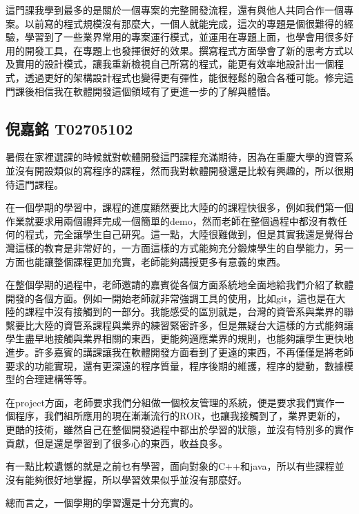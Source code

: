 這門課我學到最多的是關於一個專案的完整開發流程，還有與他人共同合作一個專案。以前寫的程式規模沒有那麼大，一個人就能完成，這次的專題是個很難得的經驗，學習到了一些業界常用的專案運行模式，並運用在專題上面，也學會用很多好用的開發工具，在專題上也發揮很好的效果。撰寫程式方面學會了新的思考方式以及實用的設計模式，讓我重新檢視自己所寫的程式，能更有效率地設計出一個程式，透過更好的架構設計程式也變得更有彈性，能很輕鬆的融合各種可能。修完這門課後相信我在軟體開發這個領域有了更進一步的了解與體悟。

\subsection*{倪嘉銘 T02705102}

暑假在家裡選課的時候就對軟體開發這門課程充滿期待，因為在重慶大學的資管系並沒有開設類似的寫程序的課程，然而我對軟體開發還是比較有興趣的，所以很期待這門課程。

在一個學期的學習中，課程的進度顯然要比大陸的的課程快很多，例如我們第一個作業就要求用兩個禮拜完成一個簡單的demo，然而老師在整個過程中都沒有教任何的程式，完全讓學生自己研究。這一點，大陸很難做到，但是其實我還是覺得台灣這樣的教育是非常好的，一方面這樣的方式能夠充分鍛煉學生的自學能力，另一方面也能讓整個課程更加充實，老師能夠講授更多有意義的東西。

在整個學期的過程中，老師邀請的嘉賓從各個方面系統地全面地給我們介紹了軟體開發的各個方面。例如一開始老師就非常強調工具的使用，比如git，這也是在大陸的課程中沒有接觸到的一部分。我能感受的區別就是，台灣的資管系與業界的聯繫要比大陸的資管系課程與業界的練習緊密許多，但是無疑台大這樣的方式能夠讓學生盡早地接觸與業界相關的東西，更能夠適應業界的規則，也能夠讓學生更快地進步。許多嘉賓的講課讓我在軟體開發方面看到了更遠的東西，不再僅僅是將老師要求的功能實現，還有更深遠的程序質量，程序後期的維護，程序的變動，數據模型的合理建構等等。

在project方面，老師要求我們分組做一個校友管理的系統，便是要求我們實作一個程序，我們組所應用的現在漸漸流行的ROR，也讓我接觸到了，業界更新的，更酷的技術，雖然自己在整個開發過程中都出於學習的狀態，並沒有特別多的實作貢獻，但是還是學習到了很多心的東西，收益良多。

有一點比較遺憾的就是之前乜有學習，面向對象的C++和java，所以有些課程並沒有能夠很好地掌握，所以學習效果似乎並沒有那麼好。

總而言之，一個學期的學習還是十分充實的。


